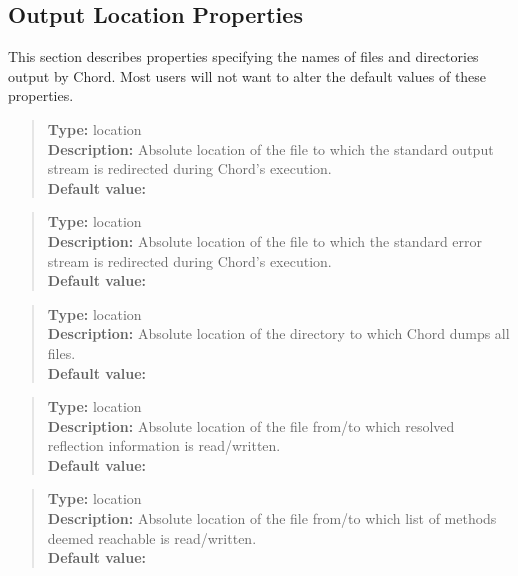 \subsection{Output Location Properties}
\label{sec:output-props}

This section describes properties specifying the names of files and directories output by Chord.
Most users will not want to alter the default values of these properties.
\\[10pt]

\begin{quote}
{\bf Type:} location \\
{\bf Description:} Absolute location of the file to which the standard output stream is redirected during Chord's execution. \\
{\bf Default value:} 
\end{quote}

\begin{quote}
{\bf Type:} location  \\
{\bf Description:} Absolute location of the file to which the standard error stream is redirected during Chord's execution. \\
{\bf Default value:} 
\end{quote}

\begin{quote}
{\bf Type:} location \\
{\bf Description:} Absolute location of the directory to which Chord dumps all files. \\
{\bf Default value:} 
\end{quote}

\begin{quote}
{\bf Type:} location  \\
{\bf Description:} Absolute location of the file from/to which resolved reflection information is read/written. \\
{\bf Default value:} 
\end{quote}

\begin{quote}
{\bf Type:} location  \\
{\bf Description:} Absolute location of the file from/to which list of methods deemed reachable is read/written. \\
{\bf Default value:} 
\end{quote}

